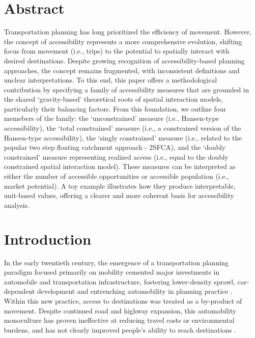 \documentclass[
  10pt,
  letterpaper,
]{article}
\begin{document}
\section*{Abstract}
Transportation planning has long prioritized the efficiency of movement.
However, the concept of accessibility represents a more comprehensive
evolution, shifting focus from movement (i.e., trips) to the potential
to spatially interact with desired destinations. Despite growing
recognition of accessibility-based planning approaches, the concept
remains fragmented, with inconsistent definitions and unclear
interpretations. To this end, this paper offers a methodological
contribution by specifying a family of accessibility measures that are
grounded in the shared `gravity-based' theoretical roots of spatial
interaction models, particularly their balancing factors. From this
foundation, we outline four memebers of the family: the `unconstrained'
measure (i.e., Hansen-type accessibility), the `total constrained'
measure (i.e., a constrained version of the Hansen-type accessibility),
the `singly constrained' measure (i.e., related to the popular two step
floating catchment approach - 2SFCA), and the `doubly constrained'
measure representing realized access (i.e., equal to the doubly
constrained spatial interaction model). These measures can be
interpreted as either the number of accessible opportunities or
accessible population (i.e., market potential). A toy example
illustrates how they produce interpretable, unit-based values, offering
a clearer and more coherent basis for accessibility analysis.


\linenumbers
\section{Introduction}\label{introduction}

In the early twentieth century, the emergence of a transportation
planning paradigm focused primarily on mobility cemented major
investments in automobile and transportation infrastructure, fostering
lower-density sprawl, car-dependent development and entrenching
automobility in planning practice
\citep{miller_collaborative_2011, lavery_driving_2013}. Within this new
practice, access to destinations was treated as a by-product of
movement. Despite continued road and highway expansion, this
automobility monoculture has proven ineffective at reducing travel costs
or environmental burdens, and has not clearly improved people's ability
to reach destinations
\citep{farber_running_2011, handyACCESSIBILITYVSMOBILITYENHANCING2002, paez_healthcare_2010}.
\end{document}
